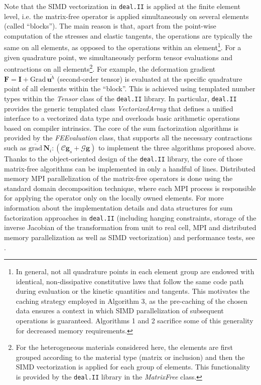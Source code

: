 \documentclass[AMA,STIX1COL]{WileyNJD-v2}
\newcommand*{\gz}[1]{\boldsymbol{#1}}
\newcommand*{\Grad}{\mathrm{Grad}}
\newcommand*{\grad}{\mathrm{grad}}
\begin{document}
Note that the SIMD vectorization
in \texttt{deal.II} \cite{dealII90}
is applied at the finite element level, i.e. the matrix-free operator is applied simultaneously on several elements (called ``blocks'').
The main reason is that, apart from the point-wise computation of the stresses and elastic tangents, the operations are typically the same on all elements{\color{red}, as opposed to the operations within an element}\footnote{%
In general, not all quadrature points in each element group are endowed with identical, non-dissipative constitutive laws that follow the same code path during evaluation or the kinetic quantities and tangents.
This motivates the caching strategy employed in Algorithm 3, as the pre-caching of the chosen data ensures a context in which SIMD parallelization of subsequent operations is guaranteed.
Algorithms 1 and 2 sacrifice some of this generality for decreased memory requirements.
}.
For a given quadrature point, we simultaneously perform tensor evaluations and contractions on all elements\footnote{%
For the heterogeneous materials considered here,
the elements are first grouped according to the material type (matrix or inclusion) and then the SIMD vectorization is applied for each group of elements.
This functionality is provided by the \texttt{deal.II} library in the \textit{MatrixFree} class.
}.
For example, the deformation gradient $\gz F = \gz I + \Grad \, \overline{\gz u^h}$ (second-order tensor) is evaluated at the specific quadrature point of all elements within the ``block''.
This is achieved using templated number types within the \textit{Tensor} class of the \texttt{deal.II} library.
In particular, \texttt{deal.II} provides the generic templated class \textit{VectorizedArray} that defines a unified interface to a vectorized data type
and overloads basic arithmetic operations based on compiler intrinsics.
The core of the sum factorization algorithms is provided by the
\textit{FEEvaluation} class, that supports all the necessary contractions such as $\overline{\grad} \, \gz N_i : (\boldsymbol{\mathcal{C}}\gz g_s  + \boldsymbol{\mathcal{G}} \gz g)$ to implement the three algorithms proposed above.
Thanks to the object-oriented design of the \texttt{deal.II} library, the core of those matrix-free algorithms can be implemented in only a handful of lines.
Distributed memory MPI parallelization of the matrix-free operators is done using the standard domain decomposition technique, where each MPI process is responsible for applying the operator only on the locally owned elements.
For more information about the implementation details and data structures for sum factorization approaches in \texttt{deal.II} (including hanging constraints, storage of the inverse Jacobian of the transformation from unit to real cell, MPI and distributed memory parallelization as well as SIMD vectorization) and performance tests, see \cite{kronbichler12}.
\end{document}
